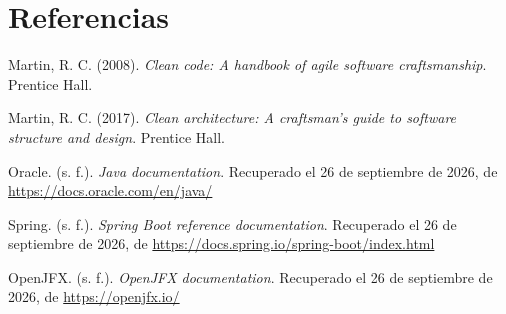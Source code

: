 \documentclass[12pt,letterpaper]{article}
\newenvironment{referencias}{%
  \list{}{%
    \setlength{\leftmargin}{1.27cm}%
    \setlength{\itemindent}{-1.27cm}%
    \setlength{\itemsep}{0.5em}%
    \setlength{\parsep}{0pt}%
  }%
}{\endlist}
\begin{document}
\section*{Referencias}
\begin{referencias}
\item Martin, R. C. (2008). \textit{Clean code: A handbook of agile software craftsmanship}. Prentice Hall.

\item Martin, R. C. (2017). \textit{Clean architecture: A craftsman's guide to software structure and design}. Prentice Hall.

\item Oracle. (s. f.). \textit{Java documentation}. Recuperado el 26 de septiembre de 2026, de \url{https://docs.oracle.com/en/java/}

\item Spring. (s. f.). \textit{Spring Boot reference documentation}. Recuperado el 26 de septiembre de 2026, de \url{https://docs.spring.io/spring-boot/index.html}

\item OpenJFX. (s. f.). \textit{OpenJFX documentation}. Recuperado el 26 de septiembre de 2026, de \url{https://openjfx.io/}
\end{referencias}
\end{document}
